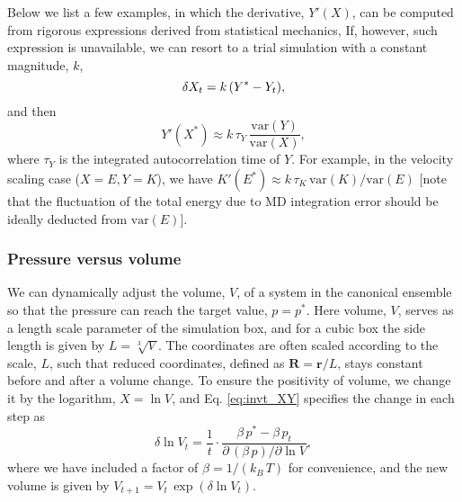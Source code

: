 \documentclass[reprint]{revtex4-1}
\begin{document}
Below we list a few examples,
in which the derivative, $Y'(X)$,
can be computed from rigorous expressions
derived from statistical mechanics,
%
If, however, such expression is unavailable,
we can resort to a trial simulation
with a constant magnitude, $k$,
%
\begin{equation}
  \delta X_t =
  k \, (Y^* - Y_t)
  ,
  \notag
  \label{eq:Berendsen_XY}
\end{equation}
%
and then
%
\begin{equation}
  Y'(X^*)
  \approx
  k \, \tau_Y \,
  \frac{
    \mathrm{var} (Y)
  }
  {
    \mathrm{var} (X)
  }
  ,
  \label{eq:dYdX_estimate}
\end{equation}
%
where $\tau_Y$ is the integrated autocorrelation time of $Y$.
%
For example, in the velocity scaling case ($X = E, Y = K$), we have
$K'(E^*) \approx k \, \tau_K \, \mathrm{var} (K) / \mathrm{var} (E)$
[note that the fluctuation of the total energy due to MD integration error
should be ideally deducted from $\mathrm{var} (E)$].



\subsubsection{Pressure versus volume}

We can dynamically adjust the volume, $V$, of a system
in the canonical ensemble
so that the pressure can reach the target value, $p = p^*$.
%
%
Here volume, $V$, serves as a length scale parameter
of the simulation box,
and for a cubic box
the side length is given by $L = \sqrt[3]{V}$.
%
The coordinates are often scaled according to the scale, $L$,
such that reduced coordinates, defined as
$\mathbf R = \mathbf r / L$,
stays constant before and after a volume change.
%
To ensure the positivity of volume,
we change it by the logarithm, $X = \ln V$,
and Eq. \eqref{eq:invt_XY} specifies
the change in each step as
$$
\delta \ln V_t
=
\frac{1}{t} \cdot
\frac{ \beta \, p^* - \beta \, p_t }
     { \partial \, ( \beta \, p) / \partial \ln V }
,
$$
where we have included a factor of $\beta = 1/(k_B \, T)$
for convenience,
and the new volume is given by $V_{t+1} = V_t \, \exp(\delta \ln V_t)$.
\end{document}
